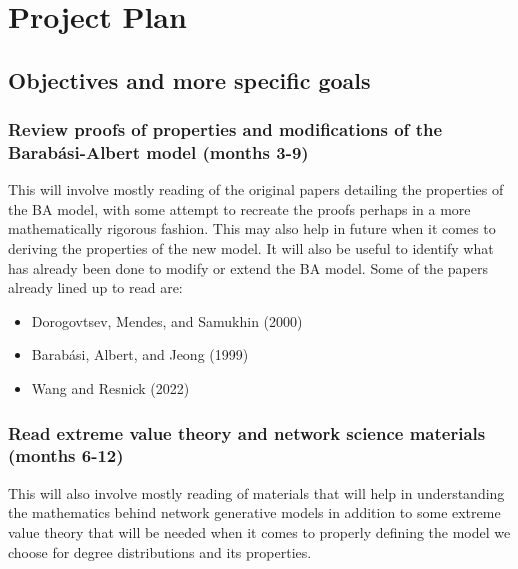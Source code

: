 \documentclass[
]{article}
\providecommand{\tightlist}{%
  \setlength{\itemsep}{0pt}\setlength{\parskip}{0pt}}\usepackage{longtable,booktabs,array}
\begin{document}
\newpage{}

\section{Project Plan}\label{project-plan}

\subsection{Objectives and more specific
goals}\label{objectives-and-more-specific-goals}

\subsubsection*{Review proofs of properties and modifications of the
Barabási-Albert model (months
3-9)}\label{review-proofs-of-properties-and-modifications-of-the-barabuxe1si-albert-model-months-3-9}

This will involve mostly reading of the original papers detailing the
properties of the BA model, with some attempt to recreate the proofs
perhaps in a more mathematically rigorous fashion. This may also help in
future when it comes to deriving the properties of the new model. It
will also be useful to identify what has already been done to modify or
extend the BA model. Some of the papers already lined up to read are:

\begin{itemize}
\tightlist
\item
  Dorogovtsev, Mendes, and Samukhin (2000)
\item
  Barabási, Albert, and Jeong (1999)
\item
  Wang and Resnick (2022)
\end{itemize}

\subsubsection*{Read extreme value theory and network science materials
(months
6-12)}\label{read-extreme-value-theory-and-network-science-materials-months-6-12}

This will also involve mostly reading of materials that will help in
understanding the mathematics behind network generative models in
addition to some extreme value theory that will be needed when it comes
to properly defining the model we choose for degree distributions and
its properties.
\end{document}
